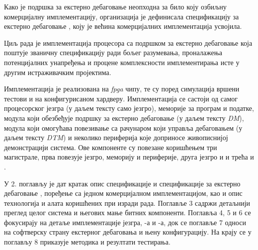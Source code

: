 Како је подршка за екстерно дебаговање неопходна за било коју озбиљну комерцијалну имплементацију,  организација је дефинисала спецификацију за екстерно дебаговање \cite{debug_spec}, коју је већина комерцијалних имплементација усвојила. \newpage

Циљ рада је имплементација  процесора са подршком за екстерно дебаговање која поштује званичну спецификацију \cite{debug_spec} ради бољег разумевања, проналажења потенцијалних унапређења и процене комплексности имплементирања исте у другим истраживачким пројектима.

Имплементација је реализована на \textit{\acrfull{fpga}} чипу, те су поред симулација вршени тестови и на конфигурисаном хардверу.
Имплементација се састоји од самог  процесорског језгра (у даљем тексту само језгро), меморије за програм и податке, модула који обезбеђује подршку за екстерно дебаговање (у даљем тексту \textit{\acrfull{DM}}), модула који омогућава повезивање са рачунаром који управља дебаговањем (у даљем тексту \textit{\acrfull{DTM}}) и неколико периферија које доприносе живописнијој демонстрацији система. Ове компоненте су повезане коришћењем три магистрале, прва повезује језгро, меморију и периферије, друга језгро и  и трећа  и .

У 2. поглављу је дат кратак опис  спецификације \cite{riscv_spec} и спецификације за екстерно дебаговање \cite{debug_spec}, поређење са једном комерцијалном имплементацијом, као и опис технологија и алата коришћених при изради рада.
Поглавље 3 садржи детаљнији преглед целог система и његових мање битних компоненти.
Поглавља 4, 5 и 6 се фокусирају на детаље имплементације језгра, -а и -а, док се поглавље 7 односи на софтверску страну екстерног дебаговања и њену конфигурацију.
На крају се у поглављу 8 приказује методика и резултати тестирања.
